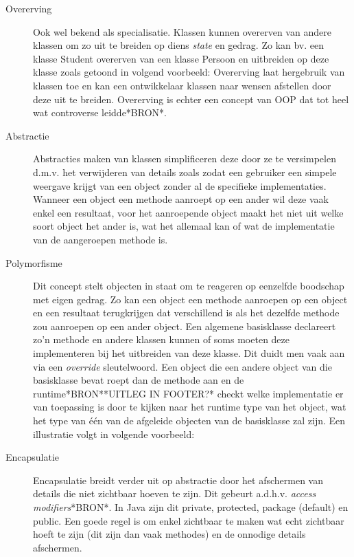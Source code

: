\begin{description}
   \item[Overerving] Ook wel bekend als specialisatie. Klassen kunnen overerven van andere klassen om zo uit te breiden op diens \textit{state} en gedrag. Zo kan bv. een klasse Student overerven van een klasse Persoon en uitbreiden op deze klasse zoals getoond in volgend voorbeeld: 
    Overerving laat hergebruik van klassen toe en kan een ontwikkelaar klassen naar wensen afstellen door deze uit te breiden. Overerving is echter een concept van OOP dat tot heel wat controverse leidde*BRON*. %
    \item[Abstractie] Abstracties maken van klassen simplificeren deze door ze te versimpelen d.m.v. het verwijderen van details zoals zodat een gebruiker een simpele weergave krijgt van een object zonder al de specifieke implementaties. Wanneer een object een methode aanroept op een ander wil deze vaak enkel een resultaat, voor het aanroepende object maakt het niet uit welke soort object het ander is, wat het allemaal kan of wat de implementatie van de aangeroepen methode is. %
    \item[Polymorfisme] Dit concept stelt objecten in staat om te reageren op eenzelfde boodschap met eigen gedrag. Zo kan een object een methode aanroepen op een object en een resultaat terugkrijgen dat verschillend is als het dezelfde methode zou aanroepen op een ander object. Een algemene basisklasse declareert zo'n methode en andere klassen kunnen of soms moeten deze implementeren bij het uitbreiden van deze klasse. Dit duidt men vaak aan via een \textit{override} sleutelwoord. Een object die een andere object van die basisklasse bevat roept dan de methode aan en de runtime*BRON**UITLEG IN FOOTER?* checkt welke implementatie er van toepassing is door te kijken naar het runtime type van het object, wat het type van één van de afgeleide objecten van de basisklasse zal zijn. Een illustratie volgt in volgende voorbeeld: %
    \item[Encapsulatie] Encapsulatie breidt verder uit op abstractie door het afschermen van details die niet zichtbaar hoeven te zijn. Dit gebeurt a.d.h.v. \textit{access modifiers}*BRON*. In Java zijn dit private, protected, package (default) en public. Een goede regel is om enkel zichtbaar te maken wat echt zichtbaar hoeft te zijn (dit zijn dan vaak methodes) en de onnodige details afschermen.
\end{description}

